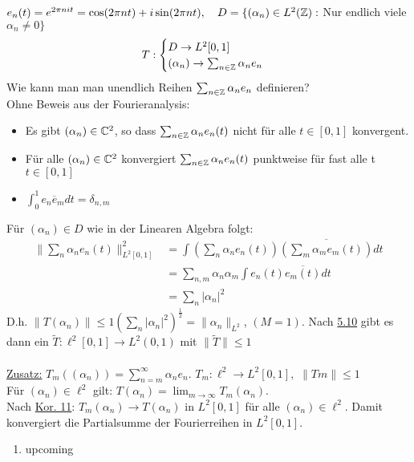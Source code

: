 \begin{beispiel}
	$e_{n} (t) = e^{2 \pi n i t} = \cos(2 \pi n t) + i \sin(2 \pi n t), \quad D = \{ (\alpha_{n}) \in L^{2}(\mathbb{Z}):$ Nur endlich viele $\alpha_{n} \neq 0 \}$
	\[ T : \begin{cases} D \rightarrow L^{2}[0, 1] \\ (\alpha_{n}) \rightarrow \sum_{n \in \mathbb{Z}} \alpha_{n} e_{n} \end{cases} \]
	Wie kann man man unendlich Reihen $\sum_{n \in \mathbb{Z}} \alpha_{n} e_{n}$ definieren? \\
	Ohne Beweis aus der Fourieranalysis:
	\begin{itemize}
		\item Es gibt $(\alpha_{n}) \in \mathbb{C}^{2}$, so dass $\sum_{n \in \mathbb{Z}} \alpha_{n} e_{n}(t)$ nicht für alle $t \in [0, 1]$ konvergent.
		\item Für alle $(\alpha_{n}) \in \mathbb{C}^{2}$ konvergiert $\sum_{n \in \mathbb{Z}} \alpha_{n} e_{n}(t)$ punktweise für fast alle t $t \in [0, 1]$
		\item $\int_{0}^{1} e_{n} \overline e_{m} dt = \delta_{n, m}$
	\end{itemize}
	Für $(\alpha_{n}) \in D$ wie in der Linearen Algebra folgt:
	\begin{align*}
		\| \sum_{n} \alpha_{n} e_{n}(t) \|_{L^{2}[0, 1]}^{2} & = \int (\sum_{n} \alpha_{n} e_{n}(t)) \overline{(\sum_{m} \alpha_{m} e_{m}(t))} dt \\
		& = \sum_{n, m} \alpha_{n} \alpha_{m} \int e_{n}(t) \overline{e_{m}(t)} dt \\
		& = \sum_{n} |\alpha_{n}|^2
	\end{align*}
	D.h. $\| T (\alpha_{n}) \| \leq 1 \left( \sum_{n} |\alpha_{n}|^2 \right)^{\frac{1}{2}} = \| \alpha_{n} \|_{L^{2}}$, $(M = 1)$. Nach \hyperref[prop:1-5.10]{5.10} gibt es dann ein $\tilde T: \ell^{2}[0, 1] \rightarrow L^{2}(0, 1)$ mit $\| \tilde T \| \leq 1$ \\ \\
	\uline{Zusatz:} $T_{m}((\alpha_{n})) = \sum_{n = m}^{\infty} \alpha_{n} e_{n}$. $T_{m}: \ell^{2} \rightarrow L^{2}[0, 1],$ $\| Tm \| \leq 1$ \\
	Für $(\alpha_{n}) \in \ell^{2}$ gilt: $T (\alpha_{n}) = \lim_{m \rightarrow \infty} T_{m}(\alpha_{n})$. \\
	Nach \hyperref[kor:1-5.11]{Kor. 11}: $T_{m}(\alpha_{n}) \rightarrow T (\alpha_{n})$ in $L^{2}[0, 1]$ für alle $(\alpha_{n}) \in \ell^{2}$. Damit konvergiert die Partialsumme der Fourierreihen in $L^{2}[0, 1]$.
\end{beispiel}

\begin{prop}
	\begin{enumerate}[label=\alph*\upshape)]
		\item upcoming
	\end{enumerate}	
\end{prop}


\newpage































